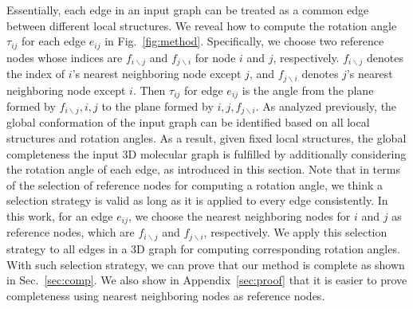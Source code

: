 \documentclass{article}
\begin{document}
Essentially, each edge in an input graph can be treated as a common edge between different local structures.
We reveal how to compute the rotation angle $\tau_{ij}$ for each edge $e_{ij}$ in Fig.~\ref{fig:method}.
Specifically, we choose two reference nodes whose indices are $f_{i\backslash j}$ and $f_{j\backslash i}$ for node $i$ and $j$, respectively.
$f_{i\backslash j}$ denotes the index of $i$'s nearest neighboring node except $j$, and $f_{j\backslash i}$ denotes $j$'s nearest neighboring node except $i$.
Then $\tau_{ij}$ for edge $e_{ij}$ is the angle from the plane formed by $f_{i\backslash j},i,j$ to the plane formed by $i,j,f_{j\backslash i}$.
As analyzed previously, the global conformation of the input graph can be identified based on all local structures and rotation angles.
As a result, given fixed local structures, 
the global completeness the input 3D molecular graph is fulfilled by additionally considering the rotation angle of each edge, as introduced in this section.
\textcolor{COLOR}{Note that in terms of the selection of reference nodes for computing a rotation angle, we think a selection strategy is valid as long as it is applied to every edge consistently. In this work, for an edge $e_{ij}$, we choose the nearest neighboring nodes for $i$ and $j$ as reference nodes, which are $f_{i\backslash j}$ and $f_{j\backslash i}$, respectively. We apply this selection strategy to all edges in a 3D graph for computing corresponding rotation angles.
With such selection strategy, we can prove that our method is complete as shown in Sec.~\ref{sec:comp}.
We also show in Appendix~\ref{sec:proof} that it is easier to prove completeness using nearest neighboring nodes as reference nodes.
}
\end{document}
